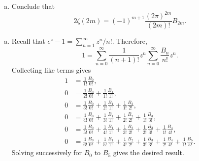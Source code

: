 \begin{pb}[4]
\begin{enumerate}[(a)]
    \item
        Conclude that
        \begin{equation*}
            2 \zeta(2m) = (-1)^{m + 1} \frac{(2\pi)^{2m}}{(2m)!}B_{2m}.
        \end{equation*}
    \end{enumerate}

\begin{soln}
    \begin{enumerate}[(a)]
    \item
        Recall that \(e^z - 1 = \sum_{n = 1}^{\infty} z^n / n!\).
        Therefore,
        \begin{equation*}
            1 = \sum_{n = 0}^{\infty} \frac{1}{(n+1)!} z^n \sum_{n = 0}^{\infty} \frac{B_n}{n!} z^n.
        \end{equation*}
        Collecting like terms gives
        \begin{align*}
            1 &= \frac{1}{1!} \frac{B_0}{0!}, \\
            0 &= \frac{1}{2!} \frac{B_0}{0!} + \frac{1}{1!} \frac{B_1}{1!}, \\
            0 &= \frac{1}{3!} \frac{B_0}{0!} + \frac{1}{2!} \frac{B_1}{1!} + \frac{1}{1!} \frac{B_2}{2!}, \\
            0 &= \frac{1}{4!} \frac{B_0}{0!} + \frac{1}{3!} \frac{B_1}{1!}
                    + \frac{1}{2!} \frac{B_2}{2!} + \frac{1}{1!} \frac{B_3}{3!}, \\ 
            0 &= \frac{1}{5!} \frac{B_0}{0!} + \frac{1}{4!} \frac{B_1}{1!}
                    + \frac{1}{3!} \frac{B_2}{2!} + \frac{1}{2!} \frac{B_3}{3!}
                    + \frac{1}{1!} \frac{B_4}{4!}, \\
            0 &= \frac{1}{6!} \frac{B_0}{0!} + \frac{1}{5!} \frac{B_1}{1!}
                    + \frac{1}{4!} \frac{B_2}{2!} + \frac{1}{3!} \frac{B_3}{3!}
                    + \frac{1}{2!} \frac{B_4}{4!} + \frac{1}{1!} \frac{B_5}{5!}.
        \end{align*}
        Solving successively for \(B_0\) to \(B_5\) gives the desired result.


\end{enumerate}
\end{soln}
\end{pb}
